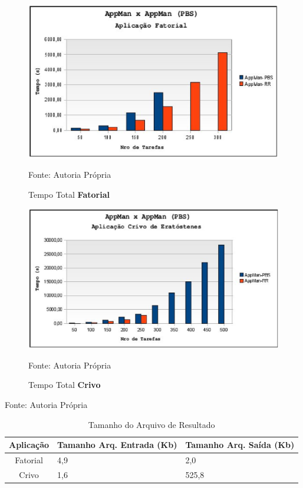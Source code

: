 \begin{figure}[htb]
\begin{center}
\includegraphics[scale=0.77]{./img/MapaFatorialTempoTotal.ps}
\caption{Tempo Total \textbf{Fatorial}}
\label{fig:fatorial_total}
Fonte: Autoria Própria
\end{center}
\end{figure}

\begin{figure}[hbtp]
\begin{center}
\includegraphics[scale=0.7]{./img/MapaCrivoTempoTotal.ps}
\caption{Tempo Total \textbf{Crivo}}
\label{fig:crivo_total}
Fonte: Autoria Própria
\end{center}
\end{figure}

\begin{table}[hbtp]
\begin{center}
\caption{Tamanho do Arquivo de Resultado}
\label{tab:tam_arquivo}
\begin{center}
Fonte: Autoria Própria
\end{center}
\begin{tabular}{c|p{3cm}|p{3cm}}
	\hline
		{\bf Aplicação } & {\bf Tamanho Arq. Entrada (Kb)} & {\bf Tamanho Arq. Saída (Kb) }\\
	\hline
	Fatorial & 4,9 & 2,0\\ \hline
	Crivo & 1,6 & 525,8\\ \hline
\end{tabular}
\end{center}
\end{table}

